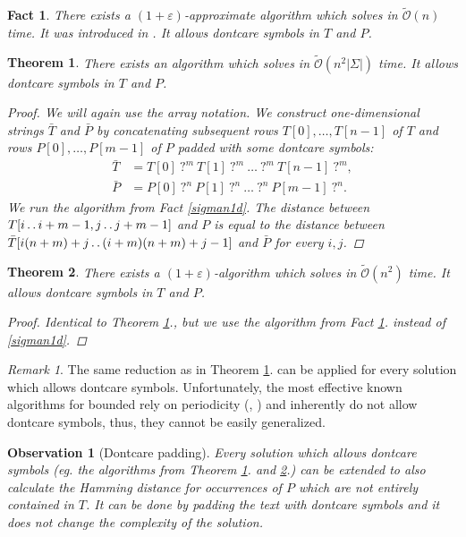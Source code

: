 \documentclass[11pt]{article}
\def\dd{\mathinner{.\,.}}
\newcommand{\tO}{\tilde{\mathcal{O}}}
\newcommand{\eq}[1]{\begin{align*} #1 \end{align*}}
\theoremstyle{plain}
\newtheorem{theorem}{Theorem}
\newtheorem{fact}{Fact}
\newtheorem{observation}{Observation}
\theoremstyle{definition}
\theoremstyle{remark}
\newtheorem*{remark}{Remark}
\begin{document}
\begin{fact}\label{approx1d}
	There exists a $(1 + \varepsilon)$-approximate algorithm which solves \hd in $\tO(n)$ time.
	It was introduced in \cite{Karloff1993}.
	It allows dontcare symbols in $T$ and $P$.
\end{fact}


\begin{theorem}\label{sigman2d}
	There exists an algorithm which solves \HD in $\tO(n^2|\Sigma|)$ time.
	It allows dontcare symbols in $T$ and $P$.
	\begin{proof}
		We will again use the array notation.
		We construct one-dimensional strings $\bar{T}$ and $\bar{P}$ by concatenating subsequent rows $T[0], \dots, T[n - 1]$ of $T$ and rows $P[0], \dots, P[m - 1]$ of $P$ padded with some dontcare symbols:
		\eq{
			\bar{T} &= T[0] \ \texttt{?}^{m} \ T[1] \ \texttt{?}^{m} \ \dots \ \texttt{?}^{m} \ T[n - 1] \ \texttt{?}^{m}, \\
			\bar{P} &= P[0] \ \texttt{?}^{n} \ P[1] \ \texttt{?}^{n} \ \dots \ \texttt{?}^{n} \ P[m - 1] \ \texttt{?}^{n}.
			}                                                                          
		We run the algorithm from Fact \ref{sigman1d}.
		The distance between $T[i \dd i + m - 1, j \dd j + m - 1]$ and $P$ is equal to the distance between $\bar{T}[i(n + m) + j \dd (i + m)(n + m) + j - 1]$ and $\bar{P}$ for every $i, j$.
	\end{proof}
\end{theorem}


\begin{theorem}\label{approx2d}
	There exists a $(1 + \varepsilon)$-algorithm which solves \HD in $\tO(n^2)$ time.
	It allows dontcare symbols in $T$ and $P$.
	\begin{proof}
		Identical to Theorem \ref{sigman2d}., but we use the algorithm from Fact \ref{approx1d}. instead of \ref{sigman1d}.
	\end{proof}
\end{theorem}


\begin{remark}
	The same reduction as in Theorem \ref{sigman2d}. can be applied for every \hd solution which allows dontcare symbols.
	Unfortunately, the most effective known algorithms for bounded \hd rely on periodicity (\cite{Clifford2015}, \cite{Gawrychowski2017}) and inherently do not allow dontcare symbols, thus, they cannot be easily generalized.
\end{remark}


\begin{observation}[Dontcare padding]
	Every \HD solution which allows dontcare symbols (eg. the algorithms from Theorem \ref{sigman2d}. and \ref{approx2d}.) can be extended to also calculate the Hamming distance for occurrences of $P$ which are not entirely contained in $T$.
	It can be done by padding the text with dontcare symbols and it does not change the complexity of the solution.
\end{observation}
\end{document}
